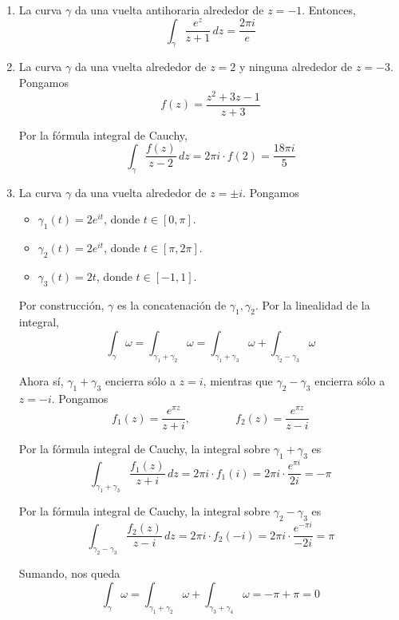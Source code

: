 \begin{solution}
\leavevmode
\begin{enumerate}[label=(\alph*)]
    \item La curva $\gamma$ da una vuelta antihoraria alrededor de $z = -1$. Entonces,
    $$\int_\gamma \frac {e^z} {z + 1} \, dz = \frac {2\pi i} e$$
    
    \item La curva $\gamma$ da una vuelta alrededor de $z = 2$ y ninguna alrededor de $z = -3$. Pongamos
    $$f(z) = \frac {z^2 + 3z - 1} {z + 3}$$
    
    Por la fórmula integral de Cauchy,
    $$\int_\gamma \frac {f(z)} {z - 2} \, dz = 2\pi i \cdot f(2) = \frac {18 \pi i} 5$$
    
    \item La curva $\gamma$ da una vuelta alrededor de $z = \pm i$. Pongamos
    \begin{itemize}
        \item $\gamma_1(t) = 2e^{it}$, donde $t \in [0, \pi]$.
        \item $\gamma_2(t) = 2e^{it}$, donde $t \in [\pi, 2\pi]$.
        \item $\gamma_3(t) = 2t$, donde $t \in [-1, 1]$.
    \end{itemize}
    
    Por construcción, $\gamma$ es la concatenación de $\gamma_1, \gamma_2$. Por la linealidad de la integral,
    $$
    \int_\gamma \omega
        = \int_{\gamma_1 + \gamma_2} \omega
        = \int_{\gamma_1 + \gamma_3} \omega + \int_{\gamma_2 - \gamma_3} \omega
    $$
    
    Ahora sí, $\gamma_1 + \gamma_3$ encierra sólo a $z = i$, mientras que $\gamma_2 - \gamma_3$ encierra sólo a $z = -i$. Pongamos
    $$f_1(z) = \frac {e^{\pi z}} {z + i}, \qquad \qquad f_2(z) = \frac {e^{\pi z}} {z - i}$$
    
    Por la fórmula integral de Cauchy, la integral sobre $\gamma_1 + \gamma_3$ es
    $$
    \int_{\gamma_1 + \gamma_3} \frac {f_1(z)} {z + i} \, dz
        = 2\pi i \cdot f_1(i)
        = 2\pi i \cdot \frac {e^{\pi i}} {2i}
        = -\pi
    $$
    
    Por la fórmula integral de Cauchy, la integral sobre $\gamma_2 - \gamma_3$ es
    $$
    \int_{\gamma_2 - \gamma_3} \frac {f_2(z)} {z - i} \, dz
        = 2\pi i \cdot f_2(-i)
        = 2\pi i \cdot \frac {e^{-\pi i}} {-2i}
        = \pi
    $$
    
    Sumando, nos queda
    $$
    \int_\gamma \omega
        = \int_{\gamma_1 + \gamma_2} \omega + \int_{\gamma_3 + \gamma_4} \omega
        = -\pi + \pi
        = 0
    $$
    

\end{enumerate}
\end{solution}
